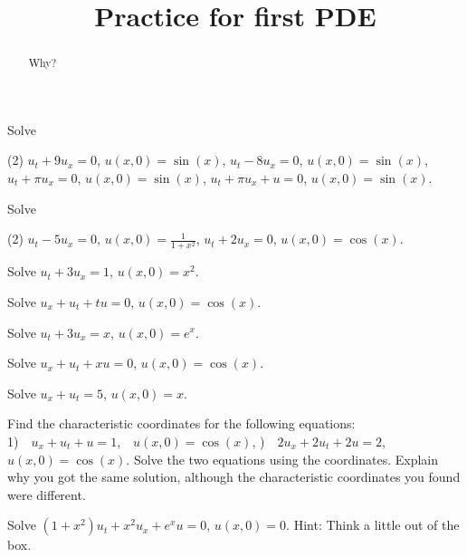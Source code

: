 \documentclass{ximera}
\title{Practice for first PDE}
\begin{document}
\begin{abstract}
    Why?
\end{abstract}
\maketitle

\begin{exercise}
    Solve
    \begin{tasks}(2)
        \task $u_t +9u_x = 0$, \enspace $u(x,0) = \sin(x)$,
        \task $u_t -8u_x = 0$, \enspace $u(x,0) = \sin(x)$,
        \task $u_t +\pi u_x = 0$, \enspace $u(x,0) = \sin(x)$,
        \task $u_t + \pi u_x + u = 0$, \enspace $u(x,0) = \sin(x)$.
    \end{tasks}
\end{exercise}

\begin{exercise}%
    Solve
    \begin{tasks}(2)
        \task $u_t - 5u_x = 0$, $u(x,0) = \frac{1}{1+x^2}$,
        \task $u_t + 2u_x = 0$, $u(x,0) = \cos(x)$.
    \end{tasks}
\end{exercise}

\begin{exercise}
    Solve $u_t +3u_x = 1$, $u(x,0) = x^2$.
\end{exercise}

\begin{exercise}%
    Solve $u_x+u_t+tu = 0$, $u(x,0) = \cos(x)$.
\end{exercise}

\begin{exercise}
    Solve $u_t +3u_x = x$, $u(x,0) = e^x$.
\end{exercise}

\begin{exercise}
    Solve $u_x+u_t+xu = 0$, $u(x,0) = \cos(x)$.
\end{exercise}

\begin{exercise}%
    Solve $u_x+u_t = 5$, $u(x,0) = x$.
\end{exercise}

\begin{exercise}    
    \begin{tasks}
        \task Find the characteristic coordinates for the following equations:\\
        1)~~$u_x+u_t + u = 1$,~~$u(x,0) = \cos(x)$,
        )~~$2u_x+2u_t +2u = 2$,~~$u(x,0) = \cos(x)$.
        \task Solve the two equations using the coordinates.
        \task Explain why you got the same solution, although the characteristic coordinates you found were different.
    \end{tasks}
\end{exercise}

\begin{exercise}
    Solve $(1+x^2) u_t + x^2 u_x + e^x u = 0$, $u(x,0) = 0$. Hint: Think a little out of the box.
\end{exercise}

\end{document}
